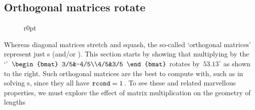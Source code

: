 \subsection{Orthogonal matrices rotate}
\label{sec:omr}


\begin{wrapfigure}r{0pt}  \end{wrapfigure}
Whereas diagonal matrices stretch and squash, the so-called 
`orthogonal matrices' represent just s (and/or ).
This section starts by showing that multiplying by the `'~\(\begin{bmat} 3/5&-4/5\\4/5&3/5 \end{bmat}\) rotates by~\(53.13^\circ\) as shown to the right.
Such orthogonal matrices are the best to compute with, such as in solving s, since they all have \(\verb|rcond|=1\)\,.
To see these and related marvellous properties, we must explore the effect of matrix multiplication on the geometry of lengths 


